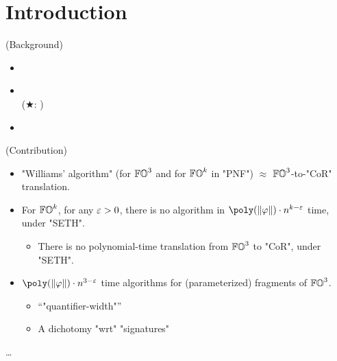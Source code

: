 \section{Introduction}\label{sec: introduction}

\begin{hidden}
\begin{screen}
    (Background) %
    \begin{itemize}
        \item {}
        \item {}\\
        ($\bigstar$: )
        \item {}
    \end{itemize}

    (Contribution)
    \begin{itemize}
        \item "Williams' algorithm" (for $\mathbb{FO}^{3}$ and for $\mathbb{FO}^{k}$ in "PNF") $\approx$ $\mathbb{FO}^{3}$-to-"CoR" translation.

        \item For $\mathbb{FO}^{k}$, for any $\varepsilon > 0$, there is no algorithm in $\poly(\len{\fml}) \cdot n^{k - \eps}$ time, under "SETH".
        \begin{itemize}
            \item There is no polynomial-time translation from $\mathbb{FO}^{3}$ to "CoR", under "SETH".
        \end{itemize}

        \item $\poly(\len{\fml}) \cdot n^{3 - \eps}$ time algorithms for (parameterized) fragments of $\mathbb{FO}^{3}$.
        \begin{itemize}
            \item ``"quantifier-width"''
            \item A dichotomy "wrt" "signatures"
        \end{itemize}
    \end{itemize}
    \dots
\end{screen}
\end{hidden}

